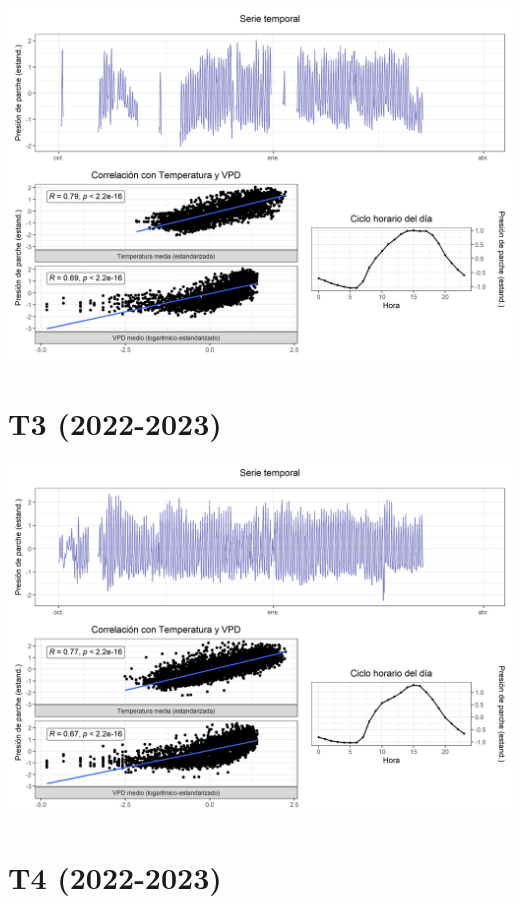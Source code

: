 \documentclass[
  letterpaper,
  DIV=11,
  numbers=noendperiod]{scrreprt}
\begin{document}
\includegraphics{figuras/05_turgor_tratamiento/2022_2023_Rio_Claro_T2.png}

\chapter{T3 (2022-2023)}

\includegraphics{figuras/05_turgor_tratamiento/2022_2023_Rio_Claro_T3.png}

\chapter{T4 (2022-2023)}
\end{document}
